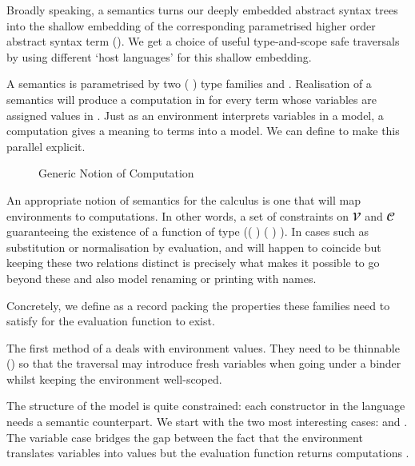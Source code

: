 Broadly speaking, a semantics turns our deeply embedded abstract syntax trees
into the shallow embedding of the corresponding parametrised higher order abstract
syntax term (\cite{chlipala2008parametric}). We get a choice of useful type-and-scope
safe traversals by using different `host languages' for this shallow embedding.

A semantics is parametrised by two ( ) type families 
and . Realisation of a semantics will produce a computation in  for every
term whose variables are assigned values in . Just as an environment interprets
variables in a model, a computation gives a meaning to terms into a model. We can
define  to make this parallel explicit.

\begin{figure}[h]
\caption{Generic Notion of Computation\label{fig:comp}}
\end{figure}

An appropriate notion of semantics for the calculus is one that will map environments
to computations. In other words, a set of constraints on $𝓥$ and $𝓒$ guaranteeing
the existence of a function of type
(( )    ( )  ).
In cases such as substitution or normalisation by evaluation,  and  will
happen to coincide but keeping these two relations distinct is precisely what makes
it possible to go beyond these and also model renaming or printing with names.

Concretely, we define  as a record packing the properties these families
need to satisfy for the evaluation function to exist.


The first method of a  deals with environment values. They
need to be thinnable () so that the traversal
may introduce fresh variables when going under a binder whilst keeping
the environment well-scoped.


The structure of the model is quite constrained: each constructor
in the language needs a semantic counterpart. We start with the
two most interesting cases:  and . The variable
case bridges the gap between the fact that the environment translates
variables into values  but the evaluation function returns
computations .

